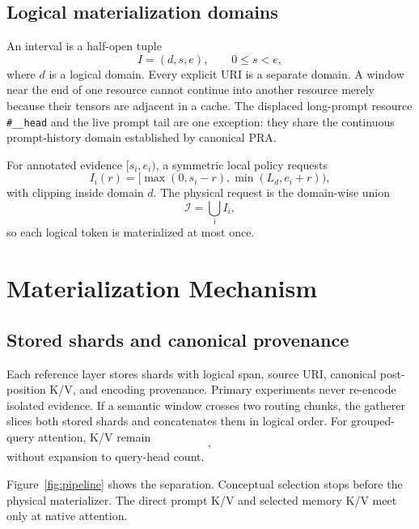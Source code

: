 \documentclass[11pt]{article}
\begin{document}
\subsection{Logical materialization domains}

An interval is a half-open tuple
\begin{equation}
 I=(d,s,e),\qquad 0\le s<e,
\end{equation}
where $d$ is a logical domain.  Every explicit URI is a separate domain.  A window near the end of
one resource cannot continue into another resource merely because their tensors are adjacent in a
cache.  The displaced long-prompt resource \texttt{\#\_\_head} and the live prompt tail are one
exception: they share the continuous prompt-history domain established by canonical PRA.

For annotated evidence $[s_i,e_i)$, a symmetric local policy requests
\begin{equation}
 I_i(r)=[\max(0,s_i-r),\min(L_d,e_i+r)),
\end{equation}
with clipping inside domain $d$.  The physical request is the domain-wise union
\begin{equation}
 \mathcal{I}=\bigcup_i I_i,
\end{equation}
so each logical token is materialized at most once.

\section{Materialization Mechanism}

\subsection{Stored shards and canonical provenance}

Each reference layer stores shards with logical span, source URI, canonical post-position K/V, and
encoding provenance.  Primary experiments never re-encode isolated evidence.  If a semantic
window crosses two routing chunks, the gatherer slices both stored shards and concatenates them in
logical order.  For grouped-query attention, K/V remain
\begin{equation}
 [1,H_{kv},T,D_h],
\end{equation}
without expansion to query-head count.

Figure~\ref{fig:pipeline} shows the separation.  Conceptual selection stops before the physical
materializer.  The direct prompt K/V and selected memory K/V meet only at native attention.
\end{document}
